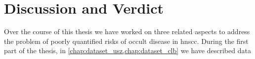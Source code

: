 \documentclass[\relativeRoot/main.tex]{subfiles}
\begin{document}
\chapter{Discussion and Verdict}
\label{chap:discussion}

Over the course of this thesis we have worked on three related aspects to address the problem of poorly quantified risks of occult disease in \gls{hnscc}. During the first part of the thesis, in \cref{chap:dataset_usz,chap:dataset_clb} we have described data





\end{document}
